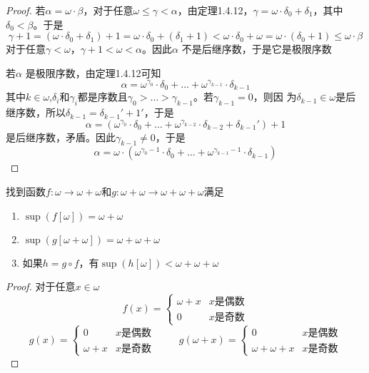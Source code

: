 \documentclass[11pt]{article}
\begin{document}
\begin{proof}
若\(\alpha=\omega\cdot\beta\)，对于任意\(\omega\le\gamma<\alpha\)，由定理1.4.12，\(\gamma=\omega\cdot\delta_0+\delta_1\)，其中\(\delta_0<\beta\)。于是
\begin{equation*}
\gamma+1=(\omega\cdot\delta_0+\delta_1)+1=\omega\cdot\delta_0+(\delta_1+1)<\omega\cdot\delta_0+\omega=\omega\cdot(\delta_0+1)\le\omega\cdot\beta
\end{equation*}
对于任意\(\gamma<\omega\)，\(\gamma+1<\omega<\alpha\)。因此\(\alpha\) 不是后继序数，于是它是极限序数

若\(\alpha\) 是极限序数，由定理1.4.12可知
\begin{equation*}
\alpha=\omega^{\gamma_0}\cdot\delta_0+\dots+\omega^{\gamma_{k-1}}\cdot\delta_{k-1}
\end{equation*}
其中\(k\in\omega\),\(\delta_i\)和\(\gamma_i\)都是序数且\(\gamma_0>\dots>\gamma_{k-1}\)。若\(\gamma_{k-1}=0\)，则因
为\(\delta_{k-1}\in\omega\)是后继序数，所以\(\delta_{k-1}=\delta_{k-1}'+1'\)，于是
\begin{equation*}
\alpha=\left( \omega^{\gamma_0}\cdot\delta_0+\dots+\omega^{\gamma_{k-2}}\cdot\delta_{k-2}+\delta_{k-1}' \right)+1
\end{equation*}
是后继序数，矛盾。因此\(\gamma_{k-1}\neq 0\)，于是
\begin{equation*}
\alpha=\omega\cdot(\omega^{\gamma_0-1}\cdot\delta_0+\dots+\omega^{\gamma_{k-1}-1}\cdot\delta_{k-1})
\end{equation*}
\end{proof}

\begin{exercise}[1.5.33]
找到函数\(f:\omega\to\omega+\omega\)和\(g:\omega+\omega\to\omega+\omega+\omega\)满足
\begin{enumerate}
\item \(\sup(f[\omega])=\omega+\omega\)
\item \(\sup(g[\omega+\omega])=\omega+\omega+\omega\)
\item 如果\(h=g\circ f\)，有\(\sup(h[\omega])<\omega+\omega+\omega\)
\end{enumerate}
\end{exercise}

\begin{proof}
对于任意\(x\in\omega\)
\begin{equation*}
f(x)=
\begin{cases}
\omega+x&x\text{是偶数}\\
0&x\text{是奇数}
\end{cases}
\end{equation*}
\begin{equation*}
g(x)=
\begin{cases}
0&x\text{是偶数}\\
\omega+x&x\text{是奇数}
\end{cases}\hspace{1cm}
g(\omega+x)=
\begin{cases}
0&x\text{是偶数}\\
\omega+\omega+x&x\text{是奇数}
\end{cases}
\end{equation*}
\end{proof}
\end{document}
